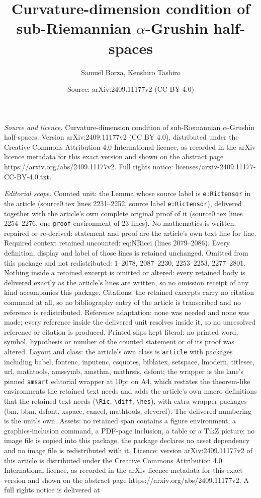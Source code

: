 \documentclass[10pt,a4paper]{amsart}
\title[Curvature-dimension condition of sub-Riemannian $\alpha$-Gru]{Curvature-dimension condition of sub-Riemannian $\alpha$-Grushin half-spaces}
\author{Samu\"el Borza, Kenshiro Tashiro}
\date{Source: arXiv:2409.11177v2 (CC BY 4.0)}
\begin{document}
\maketitle

\noindent\emph{Source and licence.} Curvature-dimension condition of sub-Riemannian $\alpha$-Grushin half-spaces. Version arXiv:2409.11177v2 (CC BY 4.0), distributed under the Creative Commons Attribution 4.0 International licence, as recorded in the arXiv licence metadata for this exact version and shown on the abstract page https://arxiv.org/abs/2409.11177v2. Full rights notice: licenses/arxiv-2409.11177-CC-BY-4.0.txt.\par\smallskip

\noindent\textit{Editorial scope.} Counted unit: the Lemma whose source label is \texttt{e:Rictensor} in the article (source0.tex lines 2231--2252, source label \texttt{e:Rictensor}), delivered together with the article's own complete original proof of it (source0.tex lines 2254--2276, one \texttt{proof} environment of 23 lines). No mathematics is written, repaired or re-derived: statement and proof are the article's own text line for line. Required context retained uncounted: eq:NRicci (lines 2079--2086). Every definition, display and label of those lines is retained unchanged. Omitted from this package and not redistributed: 1--2078, 2087--2230, 2253--2253, 2277--2801. Nothing inside a retained excerpt is omitted or altered: every retained body is delivered exactly as the article's lines are written, so no omission receipt of any kind accompanies this package. Citations: the retained excerpts carry no citation command at all, so no bibliography entry of the article is transcribed and no reference is redistributed. Reference adaptation: none was needed and none was made; every reference inside the delivered unit resolves inside it, so no unresolved reference or citation is produced. Printed slips kept literal: no printed word, symbol, hypothesis or number of the counted statement or of its proof was altered. Layout and class: the article's own class is \texttt{article} with packages including babel, fontenc, inputenc, csquotes, biblatex, setspace, lmodern, titlesec, url, mathtools, amssymb, amsthm, mathrsfs, dsfont; the wrapper is the lane's pinned \texttt{amsart} editorial wrapper at 10pt on A4, which restates the theorem-like environments the retained text needs and adds the article's own macro definitions that the retained text needs (\texttt{\textbackslash Ric}, \texttt{\textbackslash diff}, \texttt{\textbackslash hes}), with extra wrapper packages (bm, bbm, dsfont, xspace, cancel, mathtools, cleveref). The delivered numbering is the unit's own. Assets: no retained span contains a figure environment, a graphics-inclusion command, a PDF-page inclusion, a table or a TikZ picture; no image file is copied into this package, the package declares no asset dependency and no image file is redistributed with it. Licence: version arXiv:2409.11177v2 of this article is distributed under the Creative Commons Attribution 4.0 International licence, as recorded in the arXiv licence metadata for this exact version and shown on the abstract page https://arxiv.org/abs/2409.11177v2. A full rights notice is delivered at 
\end{document}
